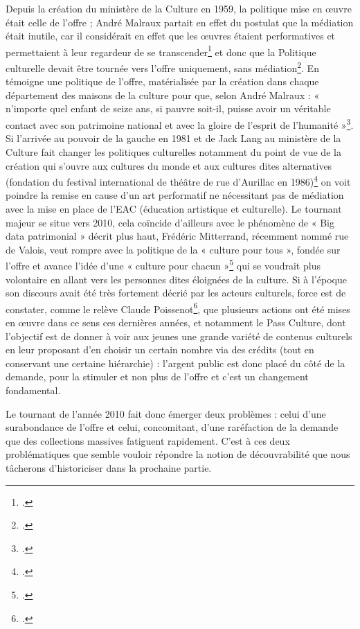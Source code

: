 Depuis la création du ministère de la Culture en 1959, la politique mise en œuvre était celle de l’offre ; André Malraux partait en effet du postulat que la médiation était inutile, car il considérait en effet que les œuvres étaient performatives et permettaient à leur regardeur de se transcender\footcite[§3]{godin2011} et donc que la Politique culturelle devait être tournée vers l’offre uniquement, sans médiation\footcite{pellegrin2022}. En témoigne une politique de l’offre, matérialisée par la création dans chaque département des maisons de la culture pour que, selon André Malraux : « n’importe quel enfant de seize ans, si pauvre soit-il, puisse avoir un véritable contact avec son patrimoine national et avec la gloire de l’esprit de l’humanité »\footcite[Entrée \enquote{maison de la culture}]{waresquiel2001}. Si l’arrivée au pouvoir de la gauche en 1981 et de Jack Lang au ministère de la Culture fait changer les politiques culturelles notamment du point de vue de la création qui s’ouvre aux cultures du monde et aux cultures dites alternatives (fondation du festival international de théâtre de rue d’Aurillac en 1986)\footcite{waresquiel2001} on voit poindre la remise en cause d’un art performatif ne nécessitant pas de médiation avec la mise en place de l’EAC (éducation artistique et culturelle). Le tournant majeur se situe vers 2010, cela coïncide d’ailleurs avec le phénomène de « Big data patrimonial » décrit plus haut, Frédéric Mitterrand, récemment nommé rue de Valois, veut rompre avec la politique de la « culture pour tous », fondée sur l’offre et avance l’idée d’une « culture pour chacun »\footcite{2010} qui se voudrait plus volontaire en allant vers les personnes dites éloignées de la culture. Si à l’époque son discours avait été très fortement décrié par les acteurs culturels, force est de constater, comme le relève Claude Poissenot\footcite{zotero-269}, que plusieurs actions ont été mises en œuvre dans ce sens ces dernières années, et notamment le Pass Culture, dont l’objectif est de donner à voir aux jeunes une grande variété de contenus culturels en leur proposant d’en choisir un certain nombre via des crédits (tout en conservant une certaine hiérarchie) : l’argent public est donc placé du côté de la demande, pour la stimuler et non plus de l’offre et c’est un changement fondamental.

Le tournant de l’année 2010 fait donc émerger deux problèmes : celui d’une surabondance de l’offre et celui, concomitant, d’une raréfaction de la demande que des collections massives fatiguent rapidement. C’est à ces deux problématiques que semble vouloir répondre la notion de découvrabilité que nous tâcherons d’historiciser dans la prochaine partie.


